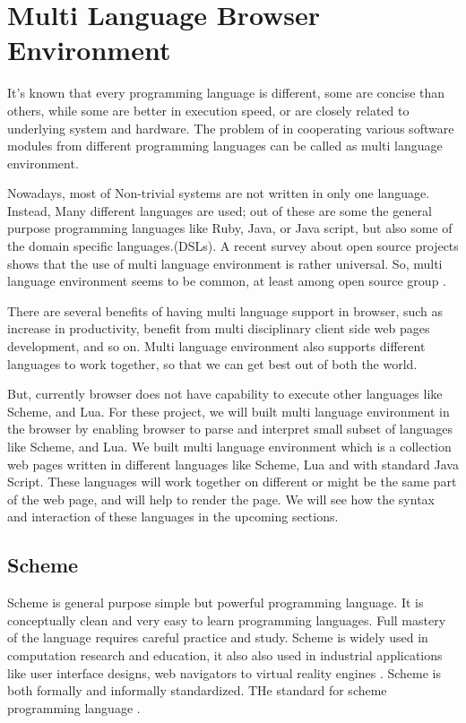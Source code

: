 \section{Multi Language Browser Environment} 

It's known that every programming language is different, some are concise than others, while some are better in execution speed, or are closely related to underlying system and hardware. The problem of in cooperating various software modules from different programming languages can be called as multi language environment.

Nowadays, most of Non-trivial systems are not written in only one language.
Instead, Many different languages are used; out of these are some the general purpose programming languages like Ruby, Java, or Java script, but also some of the domain specific languages.(DSLs). A recent survey about open source projects shows that the use of multi language environment is rather universal. So, multi language environment seems to be common, at least among open source group \cite{Mayer2017}.

There are several benefits of having multi language support in browser, such as increase in productivity, benefit from multi disciplinary client side web pages development, and so on. Multi language environment also supports different languages to work together, so that we can get best out of both the world.

But, currently browser does not have capability to execute other languages like Scheme, and Lua. For these project, we will built multi language environment in the browser by enabling browser to parse and interpret small subset of languages like Scheme, and Lua.
We built multi language environment which is a collection web pages written in different languages like Scheme, Lua and with standard Java Script. These languages will work together on different or might be the same part of the web page, and will help to render the page. We will see how the syntax and interaction of these languages in the upcoming sections. 


\subsection{Scheme}

Scheme is general purpose simple but powerful programming language.
It is conceptually clean and very easy to learn programming languages. Full mastery of the language requires careful practice and study. Scheme is widely used in computation research and education, it also also used in industrial applications like user interface designs, web navigators to virtual reality engines \cite{Dybvig:1996:SPL:525334}. Scheme is both formally and informally standardized. THe standard for scheme programming language \cite{schemeieee}.

